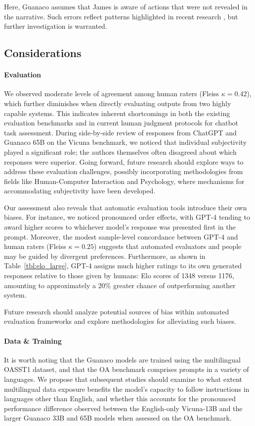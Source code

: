 Here, {Guanaco} assumes that James is aware of actions that were not revealed in the narrative. Such errors reflect patterns highlighted in recent research \cite{sap2022neural}, but further investigation is warranted.

\subsection{Considerations}
\label{ssec:considerations}

\paragraph{Evaluation}

We observed moderate levels of agreement among human raters (Fleiss $\kappa=0.42$), which further diminishes when directly evaluating outputs from two highly capable systems. This indicates inherent shortcomings in both the existing evaluation benchmarks and in current human judgment protocols for chatbot task assessment. During side-by-side review of responses from ChatGPT and {Guanaco} 65B on the Vicuna benchmark, we noticed that individual subjectivity played a significant role; the authors themselves often disagreed about which responses were superior. Going forward, future research should explore ways to address these evaluation challenges, possibly incorporating methodologies from fields like Human-Computer Interaction and Psychology, where mechanisms for accommodating subjectivity have been developed.

Our assessment also reveals that automatic evaluation tools introduce their own biases. For instance, we noticed pronounced order effects, with GPT-4 tending to award higher scores to whichever model's response was presented first in the prompt. Moreover, the modest sample-level concordance between GPT-4 and human raters (Fleiss $\kappa=0.25$) suggests that automated evaluators and people may be guided by divergent preferences. Furthermore, as shown in Table~\ref{tbl:elo_large}, GPT-4 assigns much higher ratings to its own generated responses relative to those given by humans: Elo scores of 1348 versus 1176, amounting to approximately a 20\% greater chance of outperforming another system.

Future research should analyze potential sources of bias within automated evaluation frameworks and explore methodologies for alleviating such biases.

\paragraph{Data \& Training} It is worth noting that the {Guanaco} models are trained using the multilingual OASST1 dataset, and that the OA benchmark comprises prompts in a variety of languages. We propose that subsequent studies should examine to what extent multilingual data exposure benefits the model’s capacity to follow instructions in languages other than English, and whether this accounts for the pronounced performance difference observed between the English-only Vicuna-13B and the larger {Guanaco} 33B and 65B models when assessed on the OA benchmark.


